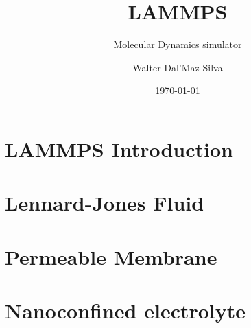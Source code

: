 \documentclass[aspectratio=169]{beamer}
\title{LAMMPS}
\subtitle{Molecular Dynamics simulator}
\author{Walter Dal'Maz Silva}
\date{\today}
\begin{document}
\maketitle

\section{LAMMPS Introduction}


\section{Lennard-Jones Fluid}


\section{Permeable Membrane}


\section{Nanoconfined electrolyte}

\end{document}
